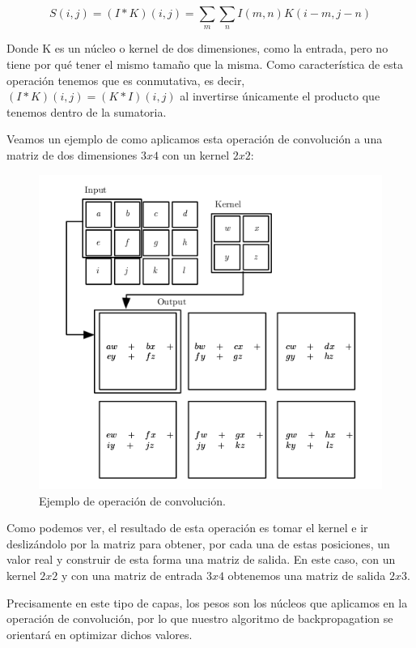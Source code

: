 $$S(i,j) = (I*K)(i,j) = \sum_{m} \sum_{n} I(m,n)K(i-m,j-n)$$

Donde K es un núcleo o kernel de dos dimensiones, como la entrada, pero no tiene por qué tener el mismo tamaño que la misma. Como característica de esta operación tenemos que es conmutativa, es decir, $(I*K)(i,j) = (K*I)(i,j)$ al invertirse únicamente el producto que tenemos dentro de la sumatoria.

Veamos un ejemplo de como aplicamos esta operación de convolución a una matriz de dos dimensiones $3x4$ con un kernel $2x2$:

\begin{figure}[H]
	\centering
	\includegraphics[scale=0.65]{imagenes/convolucion.png}
	\caption{Ejemplo de operación de convolución.}
	\label{img:convolucion}
\end{figure}

Como podemos ver, el resultado de esta operación es tomar el kernel e ir deslizándolo por la matriz para obtener, por cada una de estas posiciones, un valor real y construir de esta forma una matriz de salida. En este caso, con un kernel $2x2$ y con una matriz de entrada $3x4$ obtenemos una matriz de salida $2x3$.

Precisamente en este tipo de capas, los pesos son los núcleos que aplicamos en la operación de convolución, por lo que nuestro algoritmo de backpropagation se orientará en optimizar dichos valores.

